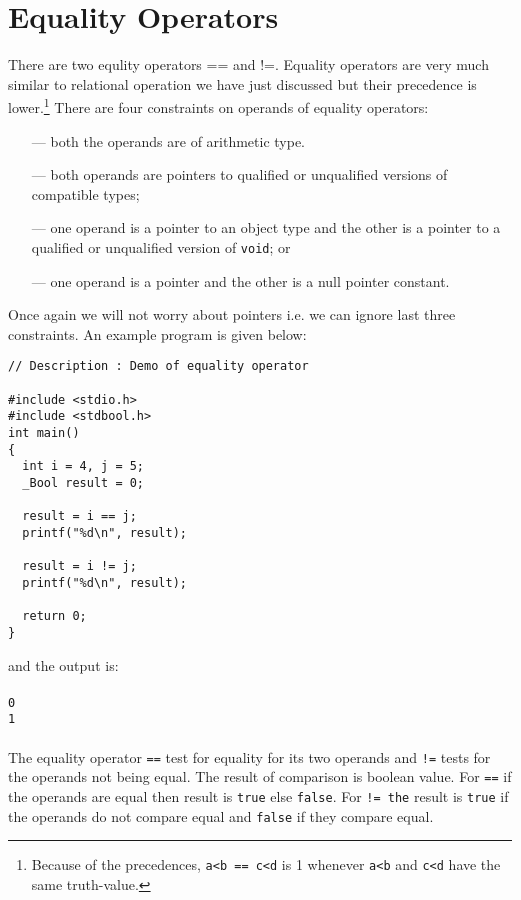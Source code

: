 \section{Equality Operators}
There are two equlity operators == and !=. Equality operators are very much
similar to relational operation we have just  
discussed but their precedence is lower.\footnote{Because of the precedences, 
\texttt{a<b == c<d} is 1 whenever \texttt{a<b} and \texttt{c<d} have the same 
truth-value.} There are four constraints on operands 
of equality operators:
\begin{itemize}
  \item[---] both the operands are of arithmetic type.
	\item[---] both operands are pointers to qualified or unqualified versions 
	of compatible types;
	\item[---] one operand is a pointer to an object type and the other is a 
	pointer to a qualified or unqualified version of \texttt{void}; or
	\item[---] one operand is a pointer and the other is a null pointer 
	constant.
\end{itemize}
Once again we will not worry about pointers i.e. we can ignore last three 
constraints. An example program is given below:
\begin{verbatim}
// Description : Demo of equality operator

#include <stdio.h>
#include <stdbool.h>
int main()
{
  int i = 4, j = 5;
  _Bool result = 0;

  result = i == j;
  printf("%d\n", result);

  result = i != j;
  printf("%d\n", result);

  return 0;
}
\end{verbatim}
and the output is:
\\\\\texttt{0\\
1}\\\\
The equality operator \texttt{==} test for equality for its two operands and
\texttt{!=} tests for the operands not being equal. The result of comparison is
boolean value. For \texttt{==} if the operands are equal then result is
\texttt{true} else \texttt{false}. For \texttt{!= the} result is \texttt{true}
if the operands do not compare equal and \texttt{false} if they compare equal.

